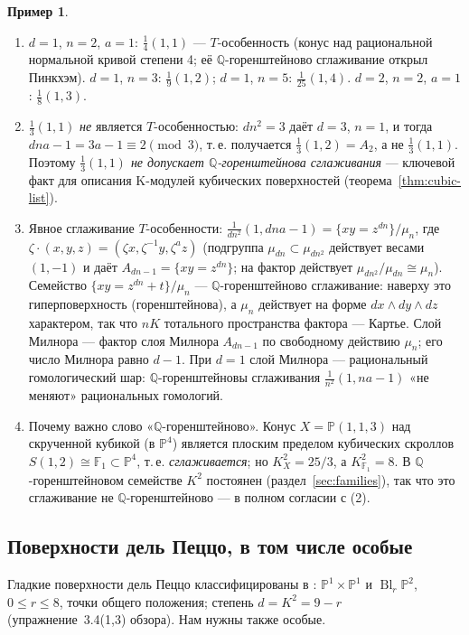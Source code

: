 \documentclass[11pt,a4paper]{article}
\theoremstyle{plain}
\theoremstyle{definition}
\newtheorem{example}[theorem]{Пример}
\theoremstyle{remark}
\newcommand{\Q}{\mathbb{Q}}
\newcommand{\PP}{\mathbb{P}}
\DeclareMathOperator{\Bl}{Bl}
\begin{document}
\begin{example}\label{ex:T-sing}
\begin{enumerate}
\item $d=1$, $n=2$, $a=1$: $\frac14(1,1)$ --- $T$-особенность (конус над рациональной нормальной
кривой степени 4; её $\Q$-горенштейново сглаживание открыл Пинкхэм). $d=1$, $n=3$: $\frac19(1,2)$;
$d=1$, $n=5$: $\frac1{25}(1,4)$. $d=2$, $n=2$, $a=1$: $\frac18(1,3)$.
\item $\frac13(1,1)$ \emph{не} является $T$-особенностью: $dn^2=3$ даёт $d=3$, $n=1$, и тогда
$dna-1=3a-1\equiv2\pmod3$, т.\,е. получается $\frac13(1,2)=A_2$, а не $\frac13(1,1)$. Поэтому
\emph{$\frac13(1,1)$ не допускает $\Q$-горенштейнова сглаживания} --- ключевой факт для описания
K-модулей кубических поверхностей (теорема~\ref{thm:cubic-list}).
\item Явное сглаживание $T$-особенности: $\frac1{dn^2}(1,dna-1)=\{xy=z^{dn}\}/\mu_n$, где
$\zeta\cdot(x,y,z)=(\zeta x,\zeta^{-1}y,\zeta^az)$ (подгруппа $\mu_{dn}\subset\mu_{dn^2}$ действует
весами $(1,-1)$ и даёт $A_{dn-1}=\{xy=z^{dn}\}$; на фактор действует $\mu_{dn^2}/\mu_{dn}\cong\mu_n$).
Семейство $\{xy=z^{dn}+t\}/\mu_n$ --- $\Q$-горенштейново сглаживание: наверху это гиперповерхность
(горенштейнова), а $\mu_n$ действует на форме $dx\wedge dy\wedge dz$ характером, так что
$nK$ тотального пространства фактора --- Картье. Слой Милнора --- фактор слоя Милнора $A_{dn-1}$
по свободному действию $\mu_n$; его число Милнора равно $d-1$. При $d=1$ слой Милнора --- рациональный
гомологический шар: $\Q$-горенштейновы сглаживания $\frac1{n^2}(1,na-1)$ «не меняют» рациональных
гомологий.
\item Почему важно слово «$\Q$-горенштейново». Конус $X=\PP(1,1,3)$ над скрученной кубикой
(в $\PP^4$) является плоским пределом кубических скроллов $S(1,2)\cong\mathbb F_1\subset\PP^4$, т.\,е.
\emph{сглаживается}; но $K_X^2=25/3$, а $K_{\mathbb F_1}^2=8$. В $\Q$-горенштейновом семействе
$K^2$ постоянен (раздел~\ref{sec:families}), так что это сглаживание не $\Q$-горенштейново ---
в полном согласии с (2).
\end{enumerate}
\end{example}

\subsection{Поверхности дель Пеццо, в том числе особые}\label{ss:dP}

Гладкие поверхности дель Пеццо классифицированы в \cite[6.10]{AG}: $\PP^1\times\PP^1$ и
$\Bl_r\PP^2$, $0\le r\le8$, точки общего положения; степень $d=K^2=9-r$ (упражнение~3.4(1,3)
обзора). Нам нужны также особые.
\end{document}

